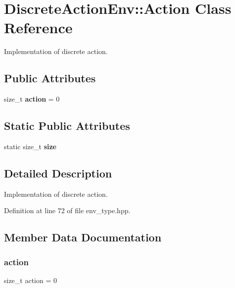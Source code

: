\section{Discrete\+Action\+Env\+:\+:Action Class Reference}
\label{classmlpack_1_1rl_1_1DiscreteActionEnv_1_1Action}


Implementation of discrete action.  


\subsection*{Public Attributes}
\begin{DoxyCompactItemize}
\item 
size\+\_\+t \textbf{ action} = 0
\end{DoxyCompactItemize}
\subsection*{Static Public Attributes}
\begin{DoxyCompactItemize}
\item 
static size\+\_\+t \textbf{ size}
\end{DoxyCompactItemize}


\subsection{Detailed Description}
Implementation of discrete action. 

Definition at line 72 of file env\+\_\+type.\+hpp.



\subsection{Member Data Documentation}
\mbox{\label{classmlpack_1_1rl_1_1DiscreteActionEnv_1_1Action_ad8b12ef32844c7a5f1317fcc232a1bca}} 
\subsubsection{action}
{\footnotesize\ttfamily size\+\_\+t action = 0}



